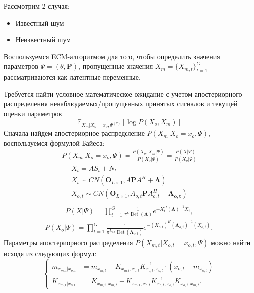 \documentclass[11pt]{article}
\newcommand{\Expect}{\mathbb{E}}
\DeclareMathOperator{\Det}{Det}
\begin{document}
Рассмотрим 2 случая:
\begin{itemize}
\item
Известный шум
\item
Неизвестный шум
\end{itemize}
\begin{center}
\fontsize{16}{20}\selectfont {}
\end{center}
Воспользуемся ECM-алгоритмом для того, чтобы определить значения параметров $\Psi = (\theta, \mathbf{P})$, пропущенные значения $X_m=\{X_{m,t}\}_{t=1}^G$ рассматриваются как латентные переменные.
\begin{center}
\fontsize{14}{18}\selectfont {}
\end{center}
Требуется найти условное математическое ожидание с учетом апостериорного распределения ненаблюдаемых/пропущенных принятых сигналов и текущей оценки параметров
\begin{equation}
 \Expect_{X_m|X_o=x_o, \Psi^{(\tau)}}[\log P(X_o, X_m)]
\end{equation}
Сначала найдем апостериорное распределение $P(X_m|X_o=x_o,\Psi)$, воспользуемся формулой Байеса:
\begin{gather}
P(X_m|X_o=x_o,\Psi) = \frac{P(X_o, X_m|\Psi)}{P(X_o|\Psi)} = \frac{P(X|\Psi)}{P(X_o|\Psi)}
\end{gather}
\begin{gather*}
X_t = AS_t + N_t \\
X_t \sim CN(\mathbf{O}_{L \times 1}, A\mathbf{P}A^H + \mathbf{\Lambda})\\
X_{o,t} \sim CN(\mathbf{O}_{L \times 1}, A_{o,t}\mathbf{P}A_{o,t}^H + \mathbf{\Lambda_{o,t}})\\
\end{gather*}
\begin{gather}
P(X|\Psi) = \prod_{t=1}^G \frac{1}{\pi^L \Det(\mathbf{\Lambda})}e^{-X_t^H (\mathbf{\Lambda})^{-1}X_t},
\end{gather}
\begin{gather}
P(X_o|\Psi) = \prod_{t=1}^G \frac{1}{\pi^{L_{o,t}} \Det(\mathbf{\Lambda}_{o,t})}e^{-(X_{o,t})^H (\mathbf{\Lambda}_{o,t})^{-1}(X_{o,t})},
\end{gather}
Параметры апостериорного распределения $P(X_{m,t}|X_{o,t}=x_{o,t},\Psi)$ можно найти исходя из следующих формул:
\begin{equation}
\left\{ \begin{aligned} 
m_{x_{m,t}|x_{o,t}} &= m_{x_{m,t}} + K_{x_{m,t},x_{o,t}}K_{x_{o,t},x_{o,t}}^{-1}\cdot(x_{o,t}-m_{x_{o,t}}) \\
K_{x_{m,t}|x_{o,t}} &= K_{x_{m,t},x_{m,t}}-K_{x_{m,t},x_{o,t}}K_{x_{o,t},x_{o,t}}^{-1}K_{x_{o,t},x_{m,t}}.
\end{aligned} \right.
\end{equation}
\end{document}
